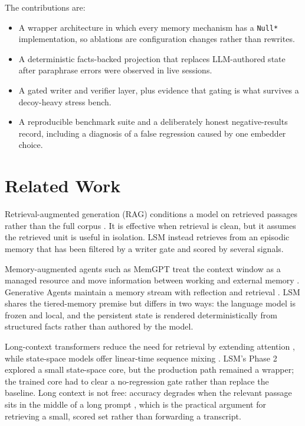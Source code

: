 \documentclass[11pt]{article}
\begin{document}
The contributions are:
\begin{itemize}
  \item A wrapper architecture in which every memory mechanism has a \texttt{Null*} implementation, so ablations are configuration changes rather than rewrites.
  \item A deterministic facts-backed projection that replaces LLM-authored state after paraphrase errors were observed in live sessions.
  \item A gated writer and verifier layer, plus evidence that gating is what survives a decoy-heavy stress bench.
  \item A reproducible benchmark suite and a deliberately honest negative-results record, including a diagnosis of a false regression caused by one embedder choice.
\end{itemize}

\section{Related Work}
Retrieval-augmented generation (RAG) conditions a model on retrieved passages rather than the full corpus \cite{lewis2020rag}. It is effective when retrieval is clean, but it assumes the retrieved unit is useful in isolation. LSM instead retrieves from an episodic memory that has been filtered by a writer gate and scored by several signals.

Memory-augmented agents such as MemGPT treat the context window as a managed resource and move information between working and external memory \cite{packer2023memgpt}. Generative Agents maintain a memory stream with reflection and retrieval \cite{park2023generative}. LSM shares the tiered-memory premise but differs in two ways: the language model is frozen and local, and the persistent state is rendered deterministically from structured facts rather than authored by the model.

Long-context transformers reduce the need for retrieval by extending attention \cite{beltagy2020longformer}, while state-space models offer linear-time sequence mixing \cite{gu2023mamba}. LSM's Phase 2 explored a small state-space core, but the production path remained a wrapper; the trained core had to clear a no-regression gate rather than replace the baseline. Long context is not free: accuracy degrades when the relevant passage sits in the middle of a long prompt \cite{liu2024lost}, which is the practical argument for retrieving a small, scored set rather than forwarding a transcript.
\end{document}
